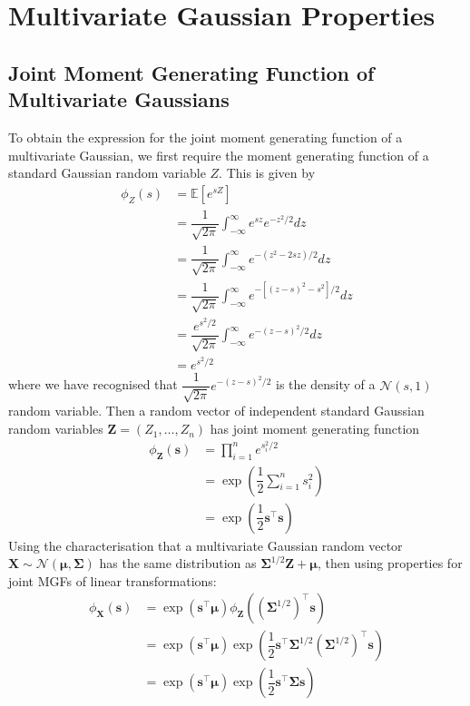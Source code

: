 \documentclass[11pt]{report} %
\begin{document}
\section{Multivariate Gaussian Properties}

\subsection{Joint Moment Generating Function of Multivariate Gaussians}

To obtain the expression for the joint moment generating function of a multivariate Gaussian, we first require the moment generating function of a standard Gaussian random variable $Z$. This is given by
\begin{align}
\phi_{Z}\left(s\right) &= \mathbb{E}\left[e^{sZ}\right] \\
&= \dfrac{1}{\sqrt{2\pi}}\int_{-\infty}^{\infty}e^{sz}e^{-z^{2}/2}dz \\
&= \dfrac{1}{\sqrt{2\pi}}\int_{-\infty}^{\infty}e^{-\left(z^{2} - 2sz\right)/2}dz \\
&= \dfrac{1}{\sqrt{2\pi}}\int_{-\infty}^{\infty}e^{-\left[\left(z - s\right)^{2} - s^{2}\right]/2}dz \\
&= \dfrac{e^{s^{2}/2}}{\sqrt{2\pi}}\int_{-\infty}^{\infty}e^{-\left(z - s\right)^{2}/2}dz \\
&= e^{s^{2}/2}
\end{align}
where we have recognised that $\dfrac{1}{\sqrt{2\pi}}e^{-\left(z - s\right)^{2}/2}$ is the density of a $\mathcal{N}\left(s, 1\right)$ random variable. Then a random vector of independent standard Gaussian random variables $\mathbf{Z} = \left(Z_{1}, \dots, Z_{n}\right)$ has joint moment generating function
\begin{align}
\phi_{\mathbf{Z}}\left(\mathbf{s}\right) &= \prod_{i = 1}^{n}e^{s_{i}^{2}/2} \\
&= \exp\left(\dfrac{1}{2}\sum_{i = 1}^{n}s_{i}^{2}\right) \\
&= \exp\left(\dfrac{1}{2}\mathbf{s}^{\top}\mathbf{s}\right)
\end{align}
Using the characterisation that a multivariate Gaussian random vector $\mathbf{X} \sim \mathcal{N}\left(\boldsymbol{\mu}, \boldsymbol{\Sigma}\right)$ has the same distribution as $\boldsymbol{\Sigma}^{1/2}\mathbf{Z} + \boldsymbol{\mu}$, then using properties for joint MGFs of linear transformations:
\begin{align}
\phi_{\mathbf{X}}\left(\mathbf{s}\right) &= \exp\left(\mathbf{s}^{\top}\boldsymbol{\mu}\right)\phi_{\mathbf{Z}}\left(\left(\boldsymbol{\Sigma}^{1/2}\right)^{\top}\mathbf{s}\right) \\
&= \exp\left(\mathbf{s}^{\top}\boldsymbol{\mu}\right)\exp\left(\dfrac{1}{2}\mathbf{s}^{\top}\boldsymbol{\Sigma}^{1/2}\left(\boldsymbol{\Sigma}^{1/2}\right)^{\top}\mathbf{s}\right) \\
&= \exp\left(\mathbf{s}^{\top}\boldsymbol{\mu}\right)\exp\left(\dfrac{1}{2}\mathbf{s}^{\top}\boldsymbol{\Sigma}\mathbf{s}\right)
\end{align}
\end{document}
